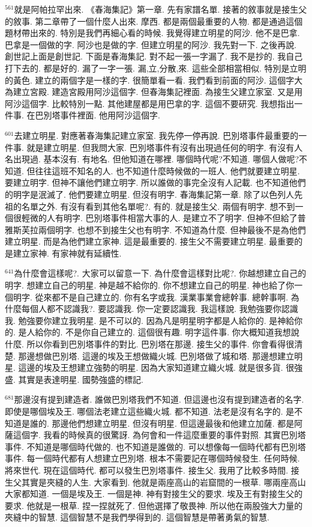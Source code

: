 \documentclass{book}
\begin{document}
$^{561}$就是阿帕拉罕出來.
《春海集記》第一章.
先有家譜名單.
接著的敘事就是接生父的敘事.
第二章帶了一個什麼人出來.
摩西.
都是兩個最重要的人物.
都是通過這個題材帶出來的.
特別是我們再細心看的時候.
我覺得建立明星的阿沙.
他不是巴拿.
巴拿是一個做的字.
阿沙也是做的字.
但建立明星的阿沙.
我先對一下.
之後再說.
創世記上面是創世記.
下面是春海集記.
對不起一張一字漏了.
我不是抄的.
我自己打下去的.
都是好的.
漏了一字一張.
漏,立,分散,來.
這些全部相當相似.
特別是立明的黃色.
建立的兩個字是一樣的字.
很簡單看一看.
我們看到前面的阿沙.
這個字大為建立宮殿.
建造宮殿用阿沙這個字.
但春海集記裡面.
為接生父建立家室.
又是用阿沙這個字.
比較特別一點.
其他建屋都是用巴拿的字.
這個不要研究.
我想指出一件事.
在巴別塔事件裡面.
他用阿沙這個字.

$^{601}$去建立明星.
對應著春海集記建立家室.
我先停一停再說.
巴別塔事件最重要的一件事.
就是建立明星.
但我問大家.
巴別塔事件有沒有出現過任何的明字.
有沒有人名出現過.
基本沒有.
有地名.
但他知道在哪裡.
哪個時代呢?不知道.
哪個人做呢?不知道.
但往往這班不知名的人.
也不知道什麼時候做的一班人.
他們就要建立明星.
要建立明字.
但神不讓他們建立明字.
所以誰做的事完全沒有人記載.
也不知道他們的明字是泯滅了.
他們要建立明星.
但沒有明字.
春海集記第一章.
除了以色列人先祖的名單之外.
有沒有看到其他名單呢?.
有的.
就是接生父.
兩個有明字.
想不到一個很輕微的人有明字.
巴別塔事件相當大事的人.
是建立不了明字.
但神不但給了普雅斯芙拉兩個明字.
也想不到接生父也有明字.
不知道為什麼.
但神最後不是為他們建立明星.
而是為他們建立家神.
這是最重要的.
接生父不需要建立明星.
最重要的是建立家神.
有家神就有延續性.

$^{641}$為什麼會這樣呢?.
大家可以留意一下.
為什麼會這樣對比呢?.
你越想建立自己的明字.
想建立自己的明星.
神是越不給你的.
你不想建立自己的明星.
神也給了你一個明字.
從來都不是自己建立的.
你有名字或我.
漢業事業會總幹事.
總幹事啊.
為什麼每個人都不認識我?.
要認識我.
你一定要認識我.
我這樣說.
我勉強要你認識我.
勉強要你建立我明星.
是不可以的.
因為凡是明星明字都是人給你的.
是神給你的.
是人給你的.
不是你自己建立的.
這個很有趣.
明字這件事.
你大概知道我想說什麼.
所以你看到巴別塔事件的對比.
巴別塔在那邊.
接生父的事件.
你會看得很清楚.
那邊想做巴別塔.
這邊的埃及王想做織火城.
巴別塔做了城和塔.
那邊想建立明星.
這邊的埃及王想建立強勢的明星.
因為大家知道建立織火城.
就是很多貨.
很強盛.
其實是表達明星.
國勢強盛的標記.

$^{681}$那邊沒有提到建造者.
誰做巴別塔我們不知道.
但這邊也沒有提到建造者的名字.
即使是哪個埃及王.
哪個法老建立這些織火城.
都不知道.
法老是沒有名字的.
是不知道是誰的.
那邊他們想建立明星.
但沒有明星.
但這邊最後和他建立加薩.
都是阿薩這個字.
我看的時候真的很驚訝.
為何會和一件這麼重要的事件對照.
其實巴別塔事件.
不知道是哪個時代做的.
也不知道是誰做的.
可以想像每一個時代都有巴別塔事件.
每一個時代都有人想建立巴別塔.
根本不需要記在哪個時候發生.
任何時候.
將來世代.
現在這個時代.
都可以發生巴別塔事件.
接生父.
我用了比較多時間.
接生父其實是夾縫的人生.
大家看到.
他就是兩座高山的岩窟間的一根草.
哪兩座高山大家都知道.
一個是埃及王.
一個是神.
神有對接生父的要求.
埃及王有對接生父的要求.
他就是一根草.
捏一捏就死了.
但他選擇了敬畏神.
所以他在兩股強大力量的夾縫中的智慧.
這個智慧不是我們學得到的.
這個智慧是帶著勇氣的智慧.
\end{document}
